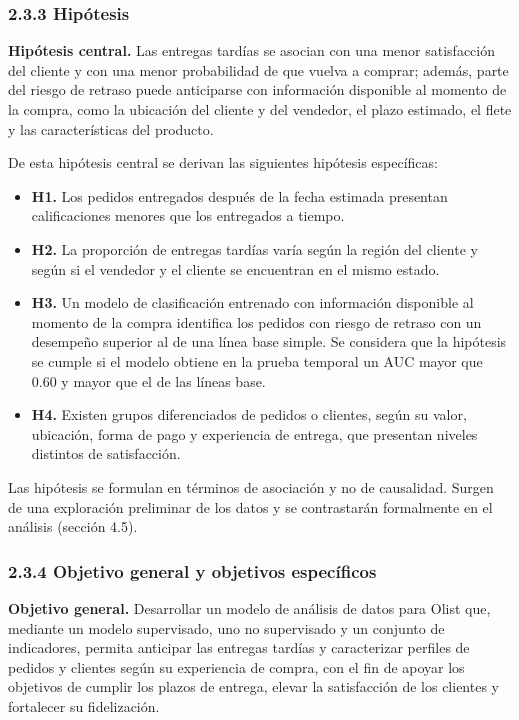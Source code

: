 \documentclass[a4paper,stu,12pt,donotrepeattitle,floatsintext]{apa7}
\begin{document}
\subsubsection{2.3.3 Hipótesis}
\textbf{Hipótesis central.} Las entregas tardías se asocian con una menor satisfacción del cliente y con una menor probabilidad de que vuelva a comprar; además, parte del riesgo de retraso puede anticiparse con información disponible al momento de la compra, como la ubicación del cliente y del vendedor, el plazo estimado, el flete y las características del producto.

De esta hipótesis central se derivan las siguientes hipótesis específicas:

\begin{itemize}
\item \textbf{H1.} Los pedidos entregados después de la fecha estimada presentan calificaciones menores que los entregados a tiempo.
\item \textbf{H2.} La proporción de entregas tardías varía según la región del cliente y según si el vendedor y el cliente se encuentran en el mismo estado.
\item \textbf{H3.} Un modelo de clasificación entrenado con información disponible al momento de la compra identifica los pedidos con riesgo de retraso con un desempeño superior al de una línea base simple. Se considera que la hipótesis se cumple si el modelo obtiene en la prueba temporal un AUC mayor que 0.60 y mayor que el de las líneas base.
\item \textbf{H4.} Existen grupos diferenciados de pedidos o clientes, según su valor, ubicación, forma de pago y experiencia de entrega, que presentan niveles distintos de satisfacción.
\end{itemize}
Las hipótesis se formulan en términos de asociación y no de causalidad. Surgen de una exploración preliminar de los datos y se contrastarán formalmente en el análisis (sección 4.5).

\subsubsection{2.3.4 Objetivo general y objetivos específicos}
\textbf{Objetivo general.} Desarrollar un modelo de análisis de datos para Olist que, mediante un modelo supervisado, uno no supervisado y un conjunto de indicadores, permita anticipar las entregas tardías y caracterizar perfiles de pedidos y clientes según su experiencia de compra, con el fin de apoyar los objetivos de cumplir los plazos de entrega, elevar la satisfacción de los clientes y fortalecer su fidelización.
\end{document}
